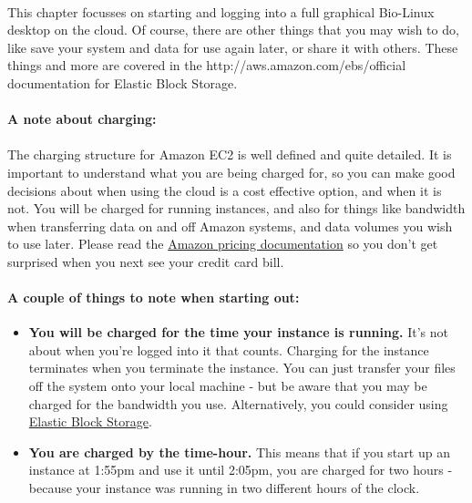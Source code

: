 \paragraph{}This chapter focusses on starting and logging into a full graphical Bio-Linux desktop on the cloud. Of course, there are other things that you may wish to do, like save your system and data for use again later, or share it with others. These things and more are covered in the {http://aws.amazon.com/ebs/}{official documentation for Elastic Block Storage}.

\paragraph{A note about charging:} 
\paragraph{}The charging structure for Amazon EC2 is well defined and quite detailed. It is important to understand what you are being charged for, so you can make good decisions about when using the cloud is a cost effective option, and when it is not. You will be charged for running instances, and also for things like bandwidth when transferring data on and off Amazon systems, and data volumes you wish to use later. Please read the \href{http://aws.amazon.com/ec2/pricing/}{Amazon pricing documentation} so you don't get surprised when you next see your credit card bill. 
\paragraph{A couple of things to note when starting out:}
\begin{itemize}
\item \textbf{You will be charged for the time your instance is running.} It's not about when you're logged into it that counts. Charging for the instance terminates when you terminate the instance. You can just transfer your files off the system onto your local machine - but be aware that you may be charged for the bandwidth you use. Alternatively, you could consider using \href{http://aws.amazon.com/ebs/}{Elastic Block Storage}. 
\item \textbf{You are charged by the time-hour.} This means that if you start up an instance at 1:55pm and use it until 2:05pm, you are charged for two hours - because your instance was running in two different hours of the clock. 

\end{itemize}

